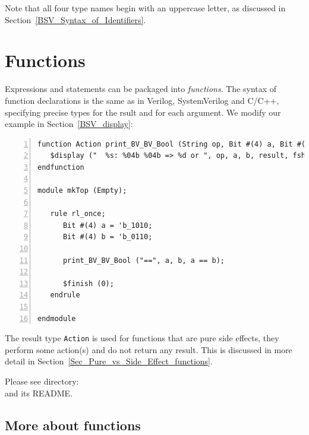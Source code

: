 Note that all four type names begin with an uppercase letter, as
discussed in Section~\ref{BSV_Syntax_of_Identifiers}.


\section{Functions}

\label{BSV_functions}


Expressions and statements can be packaged into \emph{functions}.  The
syntax of {\BSV} function declarations is the same as in Verilog,
SystemVerilog and C/C++, specifying precise types for the rsult and
for each argument.  We modify our example in
Section~\ref{BSV_display}:

{\footnotesize
\begin{Verbatim}[frame=single, numbers=left]
function Action print_BV_BV_Bool (String op, Bit #(4) a, Bit #(4) b, Bool result);
   $display ("  %s: %04b %04b => %d or ", op, a, b, result, fshow (result));
endfunction

module mkTop (Empty);

   rule rl_once;
      Bit #(4) a = 'b_1010;
      Bit #(4) b = 'b_0110;

      print_BV_BV_Bool ("==", a, b, a == b);

      $finish (0);
   endrule

endmodule
\end{Verbatim}
}

The result type \verb|Action| is used for functions that are pure side
effects, {\ie} they perform some action(s) and do not return any
result.  This is discussed in more detail in
Section~\ref{Sec_Pure_vs_Side_Effect_functions}.

\Beginexercise

Please see directory:  \\
and its README.
\Endexercise


\subsection{More about {\BSV} functions}

